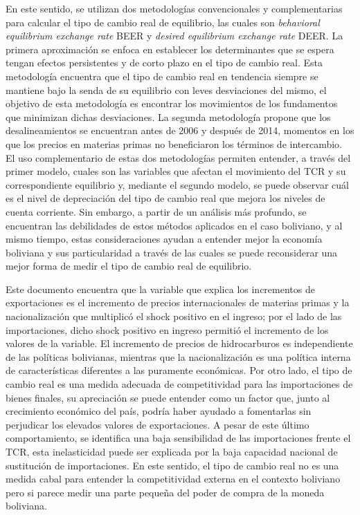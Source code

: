 \documentclass[12pt,letterpaper]{article}
\begin{document}
En este sentido, se utilizan dos metodologías convencionales y complementarias para calcular el tipo de cambio real de equilibrio, las cuales son \emph{behavioral equilibrium exchange rate} BEER y \emph{desired equilibrium exchange rate} DEER. La primera aproximación se enfoca en establecer los determinantes que se espera tengan efectos persistentes y de corto plazo en el tipo de cambio real. Esta metodología encuentra que el tipo de cambio real en tendencia siempre se mantiene bajo la senda de su equilibrio con leves desviaciones del mismo, el objetivo de esta metodología es encontrar los movimientos de los fundamentos que minimizan dichas desviaciones. La segunda metodología propone que los desalineamientos se encuentran antes de 2006 y después de 2014, momentos en los que los precios en materias primas no beneficiaron los términos de intercambio. El uso complementario de estas dos metodologías permiten entender, a través del primer modelo, cuales son las variables que afectan el movimiento del TCR y su correspondiente equilibrio y, mediante el segundo modelo, se puede observar cuál es el nivel de depreciación del tipo de cambio real que mejora los niveles de cuenta corriente. Sin embargo, a partir de un análisis más profundo, se encuentran las debilidades de estos métodos aplicados en el caso boliviano, y al mismo tiempo, estas consideraciones ayudan a entender mejor la economía boliviana y sus particularidad a través de las cuales se puede reconsiderar una mejor forma de medir el tipo de cambio real de equilibrio.

Este documento encuentra que la variable que explica los incrementos de exportaciones es el incremento de precios internacionales de materias primas y la nacionalización que multiplicó el shock positivo en el ingreso; por el lado de las importaciones, dicho shock positivo en ingreso permitió el incremento de los valores de la variable. El incremento de precios de hidrocarburos es independiente de las políticas bolivianas, mientras que la nacionalización es una política interna de características diferentes a las puramente económicas. Por otro lado, el tipo de cambio real es una medida adecuada de competitividad para las importaciones de bienes finales, su apreciación se puede entender como un factor que, junto al crecimiento económico del país, podría haber ayudado a fomentarlas sin perjudicar los elevados valores de exportaciones. A pesar de este último comportamiento, se identifica una baja sensibilidad de las importaciones frente el TCR, esta inelasticidad puede ser explicada por la baja capacidad nacional de sustitución de importaciones. En este sentido, el tipo de cambio real no es una medida cabal para entender la competitividad externa en el contexto boliviano pero si parece medir una parte pequeña del poder de compra de la moneda boliviana.
\end{document}
